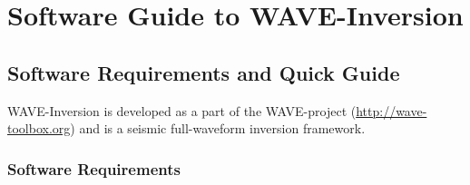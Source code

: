 \documentclass[pdftex,a4paper,parskip,listof=totoc,bibliography=totoc,onehalfspacing,12pt]{scrreprt}
\begin{document}
\part{Software Guide to WAVE-Inversion}
\chapter{Software Requirements and Quick Guide}

WAVE-Inversion is developed as a part of the WAVE-project (\url{http://wave-toolbox.org}) and is a seismic full-waveform inversion framework. 

\section{Software Requirements}
\end{document}
